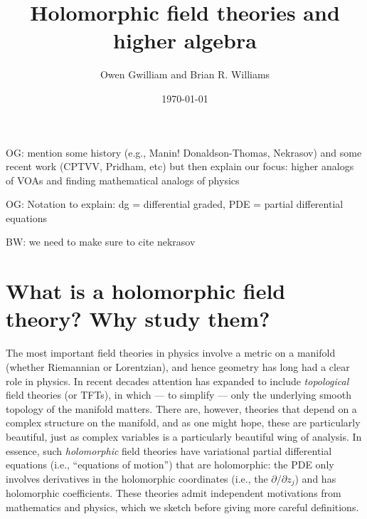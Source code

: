 \documentclass[11pt]{amsart}
\author{Owen Gwilliam and Brian R. Williams}
\date{\today}
\title{Holomorphic field theories and higher algebra}
\def\brian#1{{\textcolor{blue!65!red}{BW: {#1}}}}
\def\owen#1{{\textcolor{violet!65!black}{OG: {#1}}}}
\begin{document}

\maketitle
\tableofcontents

\owen{mention some history (e.g., Manin! Donaldson-Thomas, Nekrasov) and some recent work (CPTVV, Pridham, etc) but then explain our focus: higher analogs of VOAs and finding mathematical analogs of physics}

\owen{Notation to explain: dg = differential graded, PDE = partial differential equations}

\brian{we need to make sure to cite nekrasov}


\section{What is a holomorphic field theory? Why study them?}

The most important field theories in physics involve a metric on a manifold (whether Riemannian or Lorentzian), and hence geometry has long had a clear role in physics.
In recent decades attention has expanded to include {\em topological} field theories (or TFTs), 
in which --- to simplify --- only the underlying smooth topology of the manifold matters.
There are, however, theories that depend on a complex structure on the manifold,
and as one might hope, these are particularly beautiful, 
just as complex variables is a particularly beautiful wing of analysis.
In essence, such {\em holomorphic} field theories have variational partial differential equations (i.e., ``equations of motion'') that are holomorphic:
the PDE only involves derivatives in the holomorphic coordinates (i.e., the $\partial/\partial z_j$) and has holomorphic coefficients.
These theories admit independent motivations from mathematics and physics,
which we sketch before giving more careful definitions.
\end{document}
